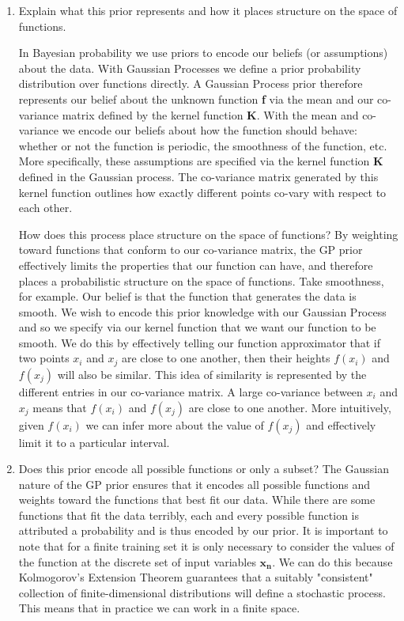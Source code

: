 \documentclass[13pt]{article}
\begin{document}
\begin{enumerate}
  \item {\large Explain what this prior represents and how it places structure on the space of functions.}
  
  In Bayesian probability we use priors to encode our beliefs (or assumptions) about the data. With Gaussian Processes we define a prior probability distribution over functions directly. A Gaussian Process prior therefore represents our belief about the unknown function \textbf{f} via the mean and our co-variance matrix defined by the kernel function \textbf{K}. With the mean and co-variance we encode our beliefs about how the function should behave: whether or not the function is periodic, the smoothness of the function, etc. More specifically, these assumptions are specified via the kernel function \textbf{K} defined in the Gaussian process. The co-variance matrix generated by this kernel function outlines how exactly different points co-vary with respect to each other.
  
  How does this process place structure on the space of functions? By weighting toward functions that conform to our co-variance matrix, the GP prior effectively limits the properties that our function can have, and therefore places a probabilistic structure on the space of functions. Take smoothness, for example. Our belief is that the function that generates the data is smooth. We wish to encode this prior knowledge with our Gaussian Process and so we specify via our kernel function that we want our function to be smooth. We do this by effectively telling our function approximator that if two points $x_i$ and $x_j$ are close to one another, then their heights $f(x_i)$ and $f(x_j)$ will also be similar. This idea of similarity is represented by the different entries in our co-variance matrix. A large co-variance between $x_i$ and $x_j$ means that $f(x_i)$ and $f(x_j)$ are close to one another. More intuitively, given $f(x_i)$ we can infer more about the value of $f(x_j)$ and effectively limit it to a particular interval.
  
  \item {\large Does this prior encode all possible functions or only a subset?}
  The Gaussian nature of the GP prior ensures that it encodes all possible functions and weights toward the functions that best fit our data. While there are some functions that fit the data terribly, each and every possible function is attributed a probability and is thus encoded by our prior. It is important to note that for a finite training set it is only necessary to consider the values of the function at the discrete set of input variables $\mathbf{x_n}$. We can do this because Kolmogorov's Extension Theorem guarantees that a suitably "consistent" collection of finite-dimensional distributions will define a stochastic process. This means that in practice we can work in a finite space.
  

\end{enumerate}
\end{document}

